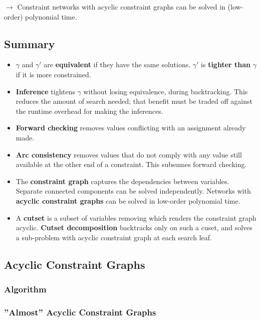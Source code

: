 \documentclass[conference, a4paper]{styles/acmsiggraph}
\begin{document}
                $\rightarrow$ Constraint networks with acyclic constraint graphs can be solved in (low-order) polynomial time.
    
    \subsection{Summary}
        \begin{itemize}
            \item $\gamma$ and $\gamma'$ are \textbf{equivalent} if they have the same solutions.
            $\gamma'$ is \textbf{tighter than} $\gamma$ if it is more constrained.
            \item \textbf{Inference} tightens $\gamma$ without losing equivalence, during backtracking.
            This reduces the amount of search needed; that benefit must be traded off against the runtime overhead for making the inferences.
            \item \textbf{Forward checking} removes values conflicting with an assignment already made.
            \item \textbf{Arc consistency} removes values that do not comply with any value still available at the other end of a constraint.
            This subsumes forward checking.
            \item The \textbf{constraint graph} captures the dependencies between variables.
            Separate connected components can be solved independently.
            Networks with \textbf{acyclic constraint graphs} can be solved in low-order polynomial time.
            \item A \textbf{cutset} is a subset of variables removing which renders the constraint graph acyclic.
            \textbf{Cutset decomposition} backtracks only on such a cuset, and solves a sub-problem with acyclic constraint graph at each search leaf.
        \end{itemize}
    
    \subsection{Acyclic Constraint Graphs}
        \subsubsection{Algorithm}
        \subsubsection{''Almost'' Acyclic Constraint Graphs}
\end{document}
